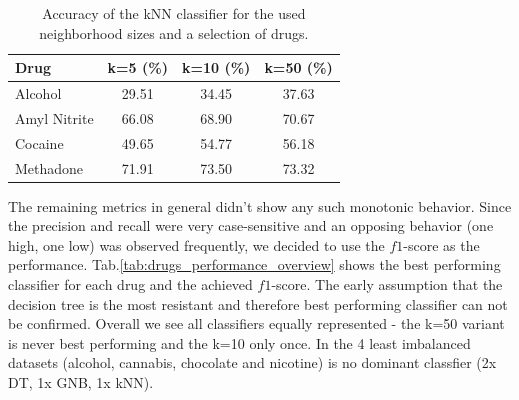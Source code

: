 \documentclass{article}
\begin{document}
\begin{table}[h!]
		\centering
    \begin{tabular}{ l c c c }
        \toprule
        \textbf{Drug} & \textbf{k=5 (\%)} & \textbf{k=10 (\%)} & \textbf{k=50 (\%)} \\
        \toprule
        Alcohol & 29.51 & 34.45 & 37.63 \\
        Amyl Nitrite & 66.08 & 68.90 & 70.67 \\
        Cocaine & 49.65 & 54.77 & 56.18 \\
        Methadone & 71.91 & 73.50 & 73.32 \\
        \bottomrule
    \end{tabular}
		\caption{Accuracy of the kNN classifier for the used neighborhood sizes and a selection of drugs.}
		\label{tab:accuracy_kNN_selection}
\end{table}

The remaining metrics in general didn't show any such monotonic behavior. Since the precision and recall were very case-sensitive and an opposing behavior (one high, one low) was observed frequently, we decided to use the $f1$-score as the performance. Tab.\ref{tab:drugs_performance_overview} shows the best performing classifier for each drug and the achieved $f1$-score.
The early assumption that the decision tree is the most resistant and therefore best performing classifier can not be confirmed. Overall we see all classifiers equally represented - the k=50 variant is never best performing and the k=10 only once. In the 4 least imbalanced datasets (alcohol, cannabis, chocolate and nicotine) is no dominant classfier (2x DT, 1x GNB, 1x kNN).
\end{document}
